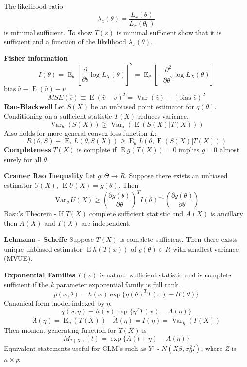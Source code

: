 \documentclass[10pt, twocolumn]{article}
\newcommand{\Expect}{\operatorname{E}}
\newcommand{\Var}{\operatorname{Var}}
\begin{document}
The likelihood ratio
\[
    \lambda_x (\theta) = \frac{L_x (\theta)}{L_x (\theta_0)}
\]
is minimal sufficient. To show $T(x)$ is minimal sufficient show that it is
sufficient and a function of the likelihood $\lambda_x (\theta)$.

\textbf{Fisher information}
\[
    I(\theta) = \Expect_\theta \left[ \frac{\partial}{\partial \theta} 
    \log L_X (\theta) \right]^2
    = \Expect_\theta \left[ - \frac{\partial^2}{\partial \theta^2}
    \log L_X (\theta) \right]
\]
$\text{bias } \hat{v} \equiv \Expect (\hat{v}) - v$
\[
    MSE(\hat{v}) \equiv \Expect (\hat{v} - v)^2 
    = \Var (\hat{v}) + (\text{bias } \hat{v})^2
\]
\textbf{Rao-Blackwell} Let $S(X)$ be an unbiased point estimator for
$g(\theta)$. Conditioning on a sufficient statistic $T(X)$ reduces
variance.
\[
    \Var_{\theta} (S(X)) \geq \Var_{\theta} (\Expect (S(X) | T(X)))
\]
Also holds for more general convex loss function $L$:
\[
    R(\theta, S) \equiv \Expect_{\theta} L(\theta, S(X)) \geq
    \Expect_{\theta} L(\theta, \Expect( S(X) | T(X)))
\]
\textbf{Completeness} $T(X)$ is complete if $\Expect g(T(X)) = 0$ 
implies $g = 0$ almost surely for all $\theta$.

\textbf{Cramer Rao Inequality} Let $g: \Theta \rightarrow R$. Suppose there
exists an unbiased estimator $U(X)$, $\Expect U(X) = g(\theta)$. Then
\[
    \Var_\theta U(X) \geq 
    \left( \frac{\partial g(\theta)}{\partial \theta} \right)^T
    I(\theta)^{-1}
    \left( \frac{\partial g(\theta)}{\partial \theta} \right)
\]
Basu's Theorem - If $T(X)$ complete sufficient statistic and $A(X)$ is 
ancillary then $A(X)$ and $T(X)$ are independent.

\textbf{Lehmann - Scheffe} Suppose $T(X)$ is complete sufficient. Then
there exists unique unbiased estimator $\Expect h(T(x))$ of $g(\theta) \in
R$ with smallest variance (MVUE). 

\textbf{Exponential Families} $T(x)$ is natural sufficient statistic and is
complete sufficient if the $k$ parameter exponential family is full rank.
\[
    p(x, \theta) = h(x) \exp \{ \eta(\theta)^T T(x) - B(\theta) \}
\]
Canonical form model indexed by $\eta$.
\[
    q(x, \eta) = h(x) \exp \{ \eta^T T(x) - A(\eta) \}
\]
\[
    \dot{A} (\eta) = \Expect_\eta (T(X)) \quad
    \ddot{A} (\eta) = I(\eta) = \Var_\eta (T(X))
\]
Then moment generating function for $T(X)$ is
\[
    M_{T(X)}(t) = \exp \{A(t + \eta) - A(\eta) \}
\]
Equivalent statements useful for GLM's such as $Y \sim N(X \beta,
\sigma_0^2 I)$, where $Z$ is $n \times p$:
\end{document}
